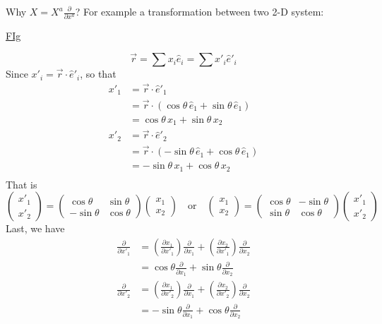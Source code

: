 Why $\displaystyle X = X^{a}\frac{\partial}{\partial x^{a}}$? For example a transformation between two 2-D system:



\underline{FIg}



\begin{equation}
\vec{r} = \sum x_{i}\hat{e}_i = \sum x'_i \hat{e}'_i
\end{equation}
Since $x'_i = \vec{r}\cdot \hat{e}'_{i}$, so that 
\begin{equation}
\begin{aligned}
x'_1
&= \vec{r}\cdot \hat{e}'_{1} \\
&= \vec{r}\cdot \left(\cos\theta\,\hat{e}_1+\sin\theta\,\hat{e}_1\right) \\
&= \cos\theta\,x_1+\sin\theta\,x_2\\[2ex]
x'_2
&= \vec{r}\cdot \hat{e}'_{2} \\
&= \vec{r}\cdot \left(-\sin\theta\,\hat{e}_1+\cos\theta\,\hat{e}_1\right) \\
&= -\sin\theta\,x_1+\cos\theta\,x_2\\
\end{aligned}
\end{equation}
That is 
\begin{equation}
\begin{pmatrix}
x'_1\\x'_2
\end{pmatrix}
=
\begin{pmatrix}
\cos\theta&\sin\theta\\
-\sin\theta&\cos\theta
\end{pmatrix}
\begin{pmatrix}
x_1\\x_2
\end{pmatrix}
\quad\text{or}\quad
\begin{pmatrix}
x_1\\x_2
\end{pmatrix}
=
\begin{pmatrix}
\cos\theta&-\sin\theta\\
\sin\theta&\cos\theta
\end{pmatrix}
\begin{pmatrix}
x'_1\\x'_2
\end{pmatrix}
\end{equation}
Last, we have
\begin{equation}
\begin{aligned}
\frac{\partial}{\partial x'_1}
&= \left(\frac{\partial x_1}{\partial x'_1}\right)\frac{\partial}{\partial x_1}
+\left(\frac{\partial x_2}{\partial x'_1}\right)\frac{\partial}{\partial x_2}\\
&= \cos\theta\frac{\partial}{\partial x_1} + \sin\theta\frac{\partial}{\partial x_2}\\[2ex]
\frac{\partial}{\partial x'_2}
&= \left(\frac{\partial x_1}{\partial x'_2}\right)\frac{\partial}{\partial x_1}
+\left(\frac{\partial x_2}{\partial x'_2}\right)\frac{\partial}{\partial x_2}\\
&= -\sin\theta\frac{\partial}{\partial x_1} + \cos\theta\frac{\partial}{\partial x_2}
\end{aligned}
\end{equation}
